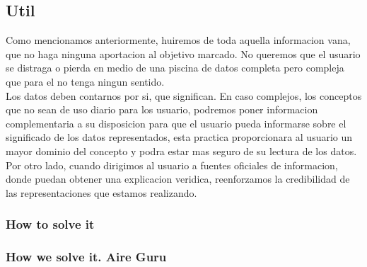\subsection{Util}
 
Como mencionamos anteriormente, huiremos de toda aquella informacion vana, que no haga ninguna aportacion
al objetivo marcado. No queremos que el usuario se distraga o pierda en medio de una piscina de datos completa
pero compleja que para el no tenga ningun sentido.\\

Los datos deben contarnos por si, que significan.
En caso complejos, los conceptos que no sean de uso diario para los usuario, podremos poner informacion
complementaria a su disposicion para que el usuario pueda informarse sobre el significado de los datos 
representados, esta practica proporcionara al usuario un mayor dominio del concepto y podra estar mas
seguro de su lectura de los datos.
Por otro lado, cuando dirigimos al usuario a fuentes oficiales de informacion, donde puedan obtener una explicacion veridica,
reenforzamos la credibilidad de las representaciones que estamos realizando.
\subsubsection{How to solve it} 


\subsubsection{How we solve it. Aire Guru} 
 
\begin{itemize}
    \done
    \crossed
    
\end{itemize}
 \newpage